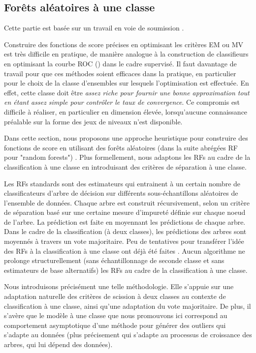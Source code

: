 \documentclass[a4paper, 12pt]{article}
\begin{document}
\subsection{Forêts aléatoires à une classe}
\label{resume_fr:ocrf}
Cette partie est basée sur un travail en voie de soumission \citep{OCRF16}.


Construire des fonctions de score précises en optimisant les critères EM ou MV est très difficile en pratique, de manière analogue à la construction de classifieurs en optimisant la courbe ROC (\cite{Clemencon2010}) dans le cadre supervisé.
%
Il faut davantage de travail pour que ces méthodes soient efficaces dans la pratique, en particulier pour le choix de la classe d'ensembles sur lesquels l'optimisation est effectuée.
En effet, cette classe doit être \emph{assez riche pour fournir une bonne approximation tout en étant assez simple pour contrôler le taux de convergence}. Ce compromis est difficile à réaliser, en particulier en dimension élevée, lorsqu'aucune connaissance préalable sur la forme des jeux de niveaux n'est disponible.

Dans cette section, nous proposons une approche heuristique pour construire des fonctions de score en utilisant des forêts aléatoires (dans la suite abrégées RF pour "random forests") \citep{Breiman2001, Genuer2008, Biau2008, Biau2016}.
Plus formellement, nous adaptons les RFs au cadre de la classification à une classe en introduisant des critères de séparation à une classe.

Les RFs standards sont des estimateurs qui entrainent à un certain nombre de classificateurs d'arbre de décision sur différents sous-échantillons aléatoires de l'ensemble de données. Chaque arbre est construit récursivement, selon un critère de séparation basé sur une certaine mesure d'impureté définie sur chaque noeud de l'arbre. La prédiction est faite en moyennant les prédictions de chaque arbre. Dans le cadre de la classification (à deux classes), les prédictions des arbres sont moyennés à travers un vote majoritaire. Peu de tentatives pour transférer l'idée des RFs à la classification à une classe ont déjà été faites \citep{Desir12, Liu2008, Shi2012}. Aucun algorithme ne prolonge structurellement (sans échantillonnage de seconde classe et sans estimateurs de base alternatifs) les RFs au cadre de la classification à une classe.

Nous introduisons précisément une telle méthodologie. Elle s'appuie sur une adaptation naturelle des critères de scission à deux classes au contexte de classification à une classe, ainsi qu'une adaptation du vote majoritaire. De plus, il s'avère que le modèle à une classe que nous promouvons ici correspond au comportement asymptotique d'une méthode pour générer des outliers qui s'adapte au données (plus précisement qui s'adapte au processus de croissance des arbres, qui lui dépend des données).
\end{document}
